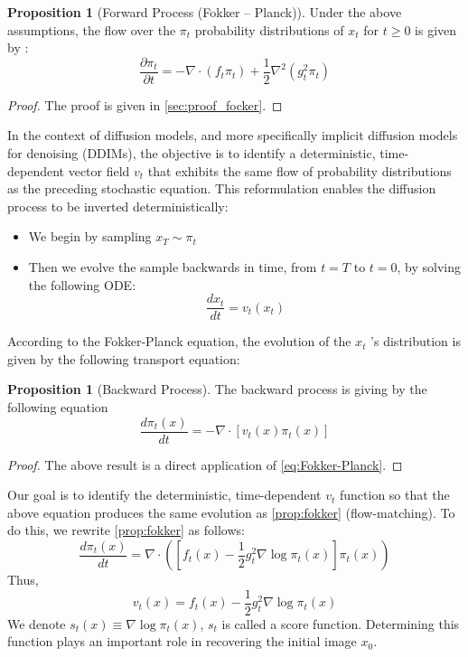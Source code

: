\documentclass[a4paper,10pt]{article}
\theoremstyle{definition} %
\theoremstyle{definition} %
\newtheorem{proposition}[definition]{Proposition}
\theoremstyle{definition} %
\theoremstyle{definition} %
\newcommand{\0}{\boldsymbol{0}}
\begin{document}
\begin{proposition}[Forward Process (Fokker – Planck)\label{prop:fokker}] 
    Under the above assumptions, the flow over the $\pi_t$ probability distributions of $x_t$ for $t \geq 0$ is given by :    \begin{equation}\label{eq:Fokker-Planck}
        \frac{\partial\pi_t}{\partial t} = -\nabla \cdot (f_t \pi_t) + \frac{1}{2}\nabla^2(g_t^2\pi_t)
    \end{equation}
\end{proposition}
\begin{proof}
    The proof is given in \cref{sec:proof_focker}.
\end{proof}
In the context of diffusion models, and more specifically implicit diffusion models for denoising (DDIMs), the objective is to identify a deterministic, time-dependent vector field $v_t$ that exhibits the same flow of probability distributions as the preceding stochastic equation. This reformulation enables the diffusion process to be inverted deterministically:
\begin{itemize}
    \item[] We begin by sampling $x_T \sim \pi_t$
    \item[] Then we evolve the sample backwards in time, from $t=T$ to $t = 0$, by solving the following ODE:
    \begin{equation}
        \frac{dx_t}{dt} = v_t(x_t)
    \end{equation}
\end{itemize}
According to the Fokker-Planck equation, the evolution of the $x_t$ 's distribution is given by the following transport equation:
\begin{proposition}[Backward Process\label{prop:fokker}] 
The backward process is giving by the following equation
\[\frac{d\pi_t(x)}{dt} =-\nabla \cdot [v_t(x)\pi_t(x)]\]
\end{proposition}
\begin{proof}
    The above result is a direct application of \cref{eq:Fokker-Planck}.
\end{proof}
Our goal is to identify the deterministic, time-dependent $v_t$ function so that the above equation produces the same evolution as \cref{prop:fokker} (flow-matching). To do this, we rewrite \cref{prop:fokker} as follows:
\[\frac{d\pi_t(x)}{dt} =\nabla \cdot([f_t(x)-\frac{1}{2}g_t^2\nabla \log\pi_t(x)]\pi_t(x))\]
Thus,
\[v_t(x) =f_t(x)-\frac{1}{2}g_t^2\nabla \log\pi_t(x) \]
We denote $s_t(x) \equiv \nabla \log\pi_t(x)$, $s_t$ is called a score function. Determining this function plays an important role in recovering the initial image $x_0$.
\end{document}
